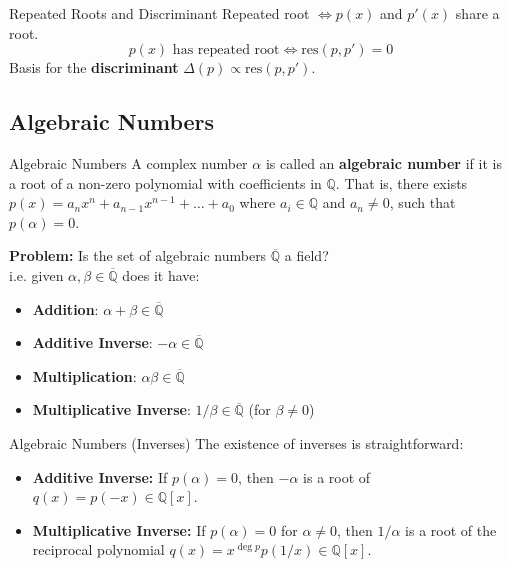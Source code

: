 \documentclass{beamer}
\begin{document}
\begin{frame}{Repeated Roots and Discriminant}
    Repeated root $\iff p(x)$ and $p'(x)$ share a root.
    \[ p(x) \text{ has repeated root} \iff \text{res}(p, p') = 0 \]
    Basis for the \textbf{discriminant} $\Delta(p) \propto \text{res}(p, p')$.
\end{frame}

\subsection{Algebraic Numbers}
\begin{frame}{Algebraic Numbers}
    A complex number $\alpha$ is called an \textbf{algebraic number} if it is a root of a non-zero polynomial with coefficients in $\mathbb{Q}$. That is, there exists $p(x) = a_nx^n + a_{n-1}x^{n-1} + \dots + a_0$ where $a_i \in \mathbb{Q}$ and $a_n \neq 0$, such that $p(\alpha) = 0$.

    \vfill

    \textbf{Problem:} Is the set of algebraic numbers $\overline{\mathbb{Q}}$ a field? \\
    i.e. given $\alpha, \beta \in \overline{\mathbb{Q}}$ does it have:
    \begin{itemize}
        \item \textbf{Addition}: $\alpha + \beta \in \overline{\mathbb{Q}}$
        \item \textbf{Additive Inverse}: $-\alpha \in \overline{\mathbb{Q}}$
        \item \textbf{Multiplication}: $\alpha \beta \in \overline{\mathbb{Q}}$
        \item \textbf{Multiplicative Inverse}: $1 / \beta \in \overline{\mathbb{Q}}$ (for $\beta \neq 0$)
    \end{itemize}
\end{frame}

\begin{frame}{Algebraic Numbers (Inverses)}
    The existence of inverses is straightforward:
    \begin{itemize}
        \item \textbf{Additive Inverse:} If $p(\alpha) = 0$, then $-\alpha$ is a root of $q(x) = p(-x) \in \mathbb{Q}[x]$.
        \item \textbf{Multiplicative Inverse:} If $p(\alpha) = 0$ for $\alpha \neq 0$, then $1/\alpha$ is a root of the reciprocal polynomial $q(x) = x^{\deg p} p(1/x) \in \mathbb{Q}[x]$.
    \end{itemize}
\end{frame}
\end{document}
